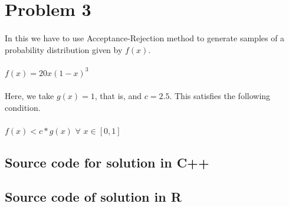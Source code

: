 \documentclass{article}
\begin{document}
		\pagebreak
		
		\section{Problem 3}
		\paragraph{}
		In this we have to use Acceptance-Rejection method to generate samples of a probability distribution given by $f(x)$.
		
		\paragraph{}
		$f(x)=20x(1-x)^3$
		
		\paragraph{}
		Here, we take $g(x)=1$, that is, and $c=2.5$. This satisfies the following condition.

		\paragraph{}
		$ f(x) < c*g(x)$  $ \forall $ $x \in [0,1]$
		
			\subsection{Source code for solution in C++}
		
	
	\subsection{Source code of solution in R}
		
		
	\pagebreak	 		
			
\end{document}
